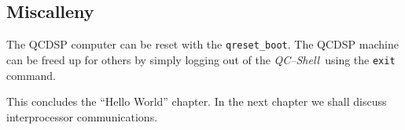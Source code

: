 \subsection{Miscalleny}
The QCDSP computer can be reset with the {\tt qreset\_boot}. The 
QCDSP machine can be freed up for others by simply logging out of 
the {\em QC--Shell}\ using the {\tt exit} command.

This concludes the ``Hello World'' chapter. In the next chapter
we shall discuss interprocessor communications.
